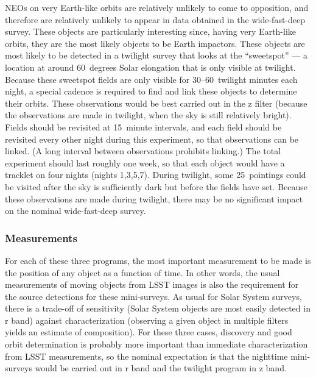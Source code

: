 \begin{itemize}
NEOs on very Earth-like orbits are relatively
unlikely to come to opposition, and therefore
are relatively unlikely to appear in data
obtained in the wide-fast-deep survey.
These objects are particularly interesting
since, having very Earth-like orbits, they
are the most likely objects to be Earth
impactors.
These objects are most likely to be detected
in a twilight survey that looks at the ``sweetspot'' ---
a location at around 60~degrees Solar
elongation that is only visible at twilight.
Because these sweetspot fields are only visible
for 30--60~twilight minutes each night,
a special
cadence is required to find and link these objects
to determine their orbits.
These observations would be best carried out
in the z filter (because the observations are
made in twilight, when the sky is still relatively
bright). Fields should be revisited at 15~minute
intervals, and each field should be revisited
every other night during this experiment, so that
observations can be linked.
(A long interval
between observations prohibits linking.)
The total experiment
should last roughly one week, so that each
object would have a tracklet on four nights
(nights 1,3,5,7).
During twilight, some 25~pointings could be visited
after the sky is sufficiently dark but
before the fields have set.
Because these observations are made during twilight,
there may be no significant impact on the
nominal wide-fast-deep survey.
\end{itemize}

\subsubsection{Measurements}

For each of these three programs, the most important measurement
to be made is the position of any object as a function of time.
In other words, the usual measurements of moving
objects from LSST images is also the requirement for
the source detections for these mini-surveys. As usual
for Solar System surveys, there is a trade-off of
sensitivity (Solar System objects are most easily
detected in r band) against characterization (observing
a given object in multiple filters yields an estimate
of composition). For these three cases, discovery and
good orbit determination is probably more important than
immediate characterization from LSST measurements,
so the nominal expectation is that 
the nighttime mini-surveys would be carried out in 
r band and the twilight program in z band.



